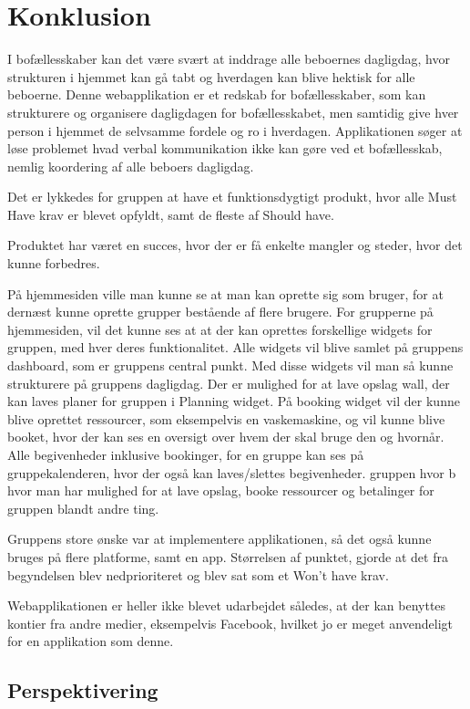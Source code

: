 \chapter{Konklusion}

I bofællesskaber kan det være svært at inddrage alle beboernes dagligdag, hvor strukturen i hjemmet kan gå tabt og hverdagen kan blive hektisk for alle beboerne. Denne webapplikation er et redskab for bofællesskaber, som kan strukturere og organisere dagligdagen for bofællesskabet, men samtidig give hver person i hjemmet de selvsamme fordele og ro i hverdagen. Applikationen søger at løse problemet hvad verbal kommunikation ikke kan gøre ved et bofællesskab, nemlig koordering af alle beboers dagligdag. 

Det er lykkedes for gruppen at have et funktionsdygtigt produkt, hvor alle Must Have krav er blevet opfyldt, samt de fleste af Should have.

Produktet har været en succes, hvor der er få enkelte mangler og steder, hvor det kunne forbedres. 

På hjemmesiden ville man kunne se at man kan oprette sig som bruger, for at dernæst kunne oprette grupper bestående af flere brugere. For grupperne på hjemmesiden, vil det kunne ses at at der kan oprettes forskellige widgets for gruppen, med hver deres funktionalitet. Alle widgets vil blive samlet på gruppens dashboard, som er gruppens central punkt. 
Med disse widgets vil man så kunne strukturere på gruppens dagligdag. Der er mulighed for at lave opslag wall, der kan laves planer for gruppen i Planning widget. På booking widget vil der kunne blive oprettet ressourcer, som eksempelvis en vaskemaskine, og vil kunne blive booket, hvor der kan ses en oversigt over hvem der skal bruge den og hvornår. Alle begivenheder inklusive bookinger, for en gruppe kan ses på gruppekalenderen, hvor der også kan laves/slettes begivenheder.  gruppen hvor b   hvor man har mulighed for at lave opslag, booke ressourcer og betalinger for gruppen blandt andre ting. 

Gruppens store ønske var at implementere applikationen, så det også kunne bruges på flere platforme, samt en app. Størrelsen af punktet, gjorde at det fra begyndelsen blev nedprioriteret og blev sat som et Won't have krav. 

Webapplikationen er heller ikke blevet udarbejdet således, at der kan benyttes kontier fra andre medier, eksempelvis Facebook, hvilket jo er meget anvendeligt for en applikation som denne. 


\section{Perspektivering}